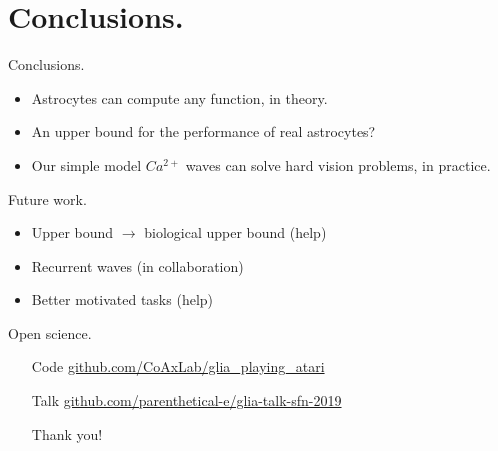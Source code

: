 \documentclass[10pt]{beamer}
\begin{document}
\section[Conclusions.]{Conclusions.}
\begin{frame}[fragile]{Conclusions.}
\begin{itemize}
\item Astrocytes can compute any function, in theory.
\item An \alert{upper bound} for the performance of real astrocytes? 
\item Our simple model $Ca^{2+}$ waves can solve hard vision problems, in practice.
\end{itemize}
\end{frame}

\begin{frame}[fragile]{Future work.}
\begin{itemize}
\item Upper bound $\rightarrow$ biological upper bound (\alert{help})
\item Recurrent waves (in collaboration)
\item Better motivated tasks (\alert{help})
\end{itemize}
\end{frame}

\begin{frame}[fragile]{Open science.}
\begin{itemize}
\item[Code] \url{github.com/CoAxLab/glia_playing_atari}
\item[Talk] \url{github.com/parenthetical-e/glia-talk-sfn-2019}
\item[] 
\item[] \alert{Thank you!}
\end{itemize}
\end{frame}


%   
%   

\end{document}
